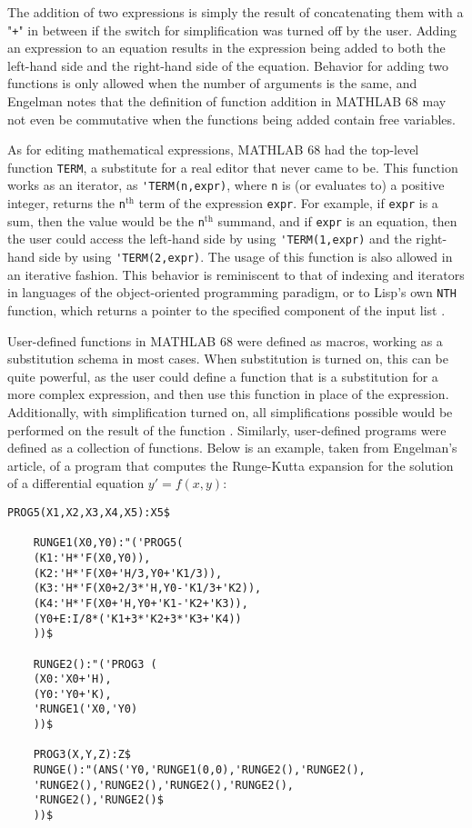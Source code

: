 The addition of two expressions is simply the result of concatenating them with a "\verb|+|" in between if the switch for simplification was turned off by the user. Adding an expression to an equation results in the expression being added to both the left-hand side and the right-hand side of the equation. Behavior for adding two functions is only allowed when the number of arguments is the same, and Engelman notes that the definition of function addition in MATHLAB 68 may not even be commutative when the functions being added contain free variables.

As for editing mathematical expressions, MATHLAB 68 had the top-level function \verb|TERM|, a substitute for a real editor that never came to be. This function works as an iterator, as \verb|'TERM(n,expr)|, where \verb|n| is (or evaluates to) a positive integer, returns the \verb|n|$^\text{th}$ term of the expression \verb|expr|. For example, if \verb|expr| is a sum, then the value would be the \verb|n|$^\text{th}$ summand, and if \verb|expr| is an equation, then the user could access the left-hand side by using \verb|'TERM(1,expr)| and the right-hand side by using \verb|'TERM(2,expr)|. The usage of this function is also allowed in an iterative fashion. This behavior is reminiscent to that of indexing and iterators in languages of the object-oriented programming paradigm, or to Lisp's own \verb|NTH| function, which returns a pointer to the specified component of the input list \parencite{touretzky2013common}.

User-defined functions in MATHLAB 68 were defined as macros, working as a substitution schema in most cases. When substitution is turned on, this can be quite powerful, as the user could define a function that is a substitution for a more complex expression, and then use this function in place of the expression. Additionally, with simplification turned on, all simplifications possible would be performed on the result of the function \parencite{engelman1971legacy}. Similarly, user-defined programs were defined as a collection of functions. Below is an example, taken from Engelman's article, of a program that computes the Runge-Kutta expansion for the solution of a differential equation $y' = f(x,y)$:

\begin{minipage}{\linewidth}
  \begin{lstlisting}[caption={Example of a user-defined program in MATHLAB 68.},label={lst:example-mathlab-68-program},numbers=none]
    PROG5(X1,X2,X3,X4,X5):X5$
  
    RUNGE1(X0,Y0):"('PROG5(
    (K1:'H*'F(X0,Y0)),
    (K2:'H*'F(X0+'H/3,Y0+'K1/3)),
    (K3:'H*'F(X0+2/3*'H,Y0-'K1/3+'K2)),
    (K4:'H*'F(X0+'H,Y0+'K1-'K2+'K3)),
    (Y0+E:I/8*('K1+3*'K2+3*'K3+'K4))
    ))$
  
    RUNGE2():"('PROG3 (
    (X0:'X0+'H),
    (Y0:'Y0+'K),
    'RUNGE1('X0,'Y0)
    ))$
  
    PROG3(X,Y,Z):Z$
    RUNGE():"(ANS('Y0,'RUNGE1(0,0),'RUNGE2(),'RUNGE2(),
    'RUNGE2(),'RUNGE2(),'RUNGE2(),'RUNGE2(),
    'RUNGE2(),'RUNGE2()$
    ))$
  \end{lstlisting}
\end{minipage}

